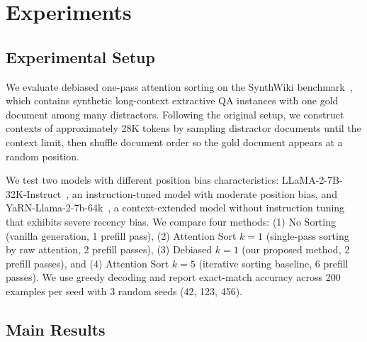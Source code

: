\section{Experiments}
\label{sec:experiments}

\subsection{Experimental Setup}

We evaluate debiased one-pass attention sorting on the SynthWiki benchmark~\citep{Peysakhovich2023AttentionSC}, which contains synthetic long-context extractive QA instances with one gold document among many distractors. Following the original setup, we construct contexts of approximately 28K tokens by sampling distractor documents until the context limit, then shuffle document order so the gold document appears at a random position.

We test two models with different position bias characteristics: LLaMA-2-7B-32K-Instruct~\citep{Touvron2023Llama2O}, an instruction-tuned model with moderate position bias, and YaRN-Llama-2-7b-64k~\citep{Peng2023YaRNEC}, a context-extended model without instruction tuning that exhibits severe recency bias. We compare four methods: (1) No Sorting (vanilla generation, 1 prefill pass), (2) Attention Sort $k=1$ (single-pass sorting by raw attention, 2 prefill passes), (3) Debiased $k=1$ (our proposed method, 2 prefill passes), and (4) Attention Sort $k=5$ (iterative sorting baseline, 6 prefill passes). We use greedy decoding and report exact-match accuracy across 200 examples per seed with 3 random seeds (42, 123, 456).

\subsection{Main Results}

\begin{table}[t]
\centering
\caption{Results on SynthWiki@28K with LLaMA-2-7B-32K-Instruct. Debiased $k=1$ produces identical results to uncalibrated $k=1$, indicating position-bias correction has zero effect on this model. Best in \textbf{bold}.}
\label{tab:llama_results}
\end{table}

